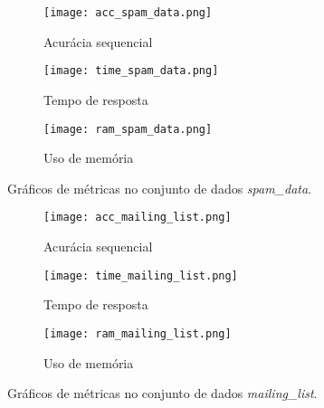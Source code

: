 \begin{figure}[!htb]
\centering
\begin{subfigure}[b]{0.485\textwidth}
\texttt{[image: acc\_spam\_data.png]}
\caption{Acurácia sequencial} \label{fig:spam_data_1a}
\end{subfigure}
\hfill %
\begin{subfigure}[b]{0.485\textwidth}
\texttt{[image: time\_spam\_data.png]}
\caption{Tempo de resposta} \label{fig:spam_data_1b}
\end{subfigure}
\begin{subfigure}[b]{0.5\textwidth}
\texttt{[image: ram\_spam\_data.png]}
\caption{Uso de memória} \label{fig:spam_data_1c}
\end{subfigure}
\caption[Gráficos de métricas no conjunto de dados \textit{spam\_data}]{Gráficos de métricas no conjunto de dados \textit{spam\_data}.} \label{fig:spam_data}
\end{figure}



\begin{figure}[!htb]
\centering
\begin{subfigure}{0.485\textwidth}
\texttt{[image: acc\_mailing\_list.png]}
\caption{Acurácia sequencial} \label{fig:mailing_1a}
\end{subfigure}
\hfill
\begin{subfigure}{0.48\textwidth}
\texttt{[image: time\_mailing\_list.png]}
\caption{Tempo de resposta} \label{fig:mailing_1b}
\end{subfigure}
\begin{subfigure}{0.5\textwidth}
\texttt{[image: ram\_mailing\_list.png]}
\caption{Uso de memória} \label{mailing_fig:1c}
\end{subfigure}
\caption[Gráficos de métricas no conjunto de dados \textit{mailing\_list}]{Gráficos de métricas no conjunto de dados \textit{mailing\_list}.} \label{fig:mailing_list}
\end{figure}



